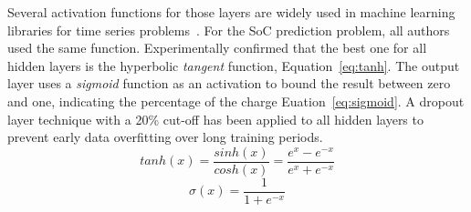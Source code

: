 
%
Several activation functions for those layers are widely used in machine learning libraries for time series problems~\cite{amidi_cs_2018}.
For the SoC prediction problem, all authors used the same function.
Experimentally confirmed that the best one for all hidden layers is the hyperbolic \textit{tangent} function, \mbox{Equation~\ref{eq:tanh}}.
The output layer uses a \textit{sigmoid} function as an activation to bound the result between zero and one, indicating the percentage of the charge \mbox{Euation~\ref{eq:sigmoid}}.
A dropout layer technique with a 20\% cut-off has been applied to all hidden layers to prevent early data overfitting over long training periods.
\begin{equation}
    tanh(x) = \frac{sinh(x)}{cosh(x)}=\frac{e^x-e^{-x}}{e^x+e^{-x}}
    \label{eq:tanh}
\end{equation}
\begin{equation}
    \sigma(x) = \frac{1}{1+e^{-x}}
    \label{eq:sigmoid}
\end{equation}
%
%

